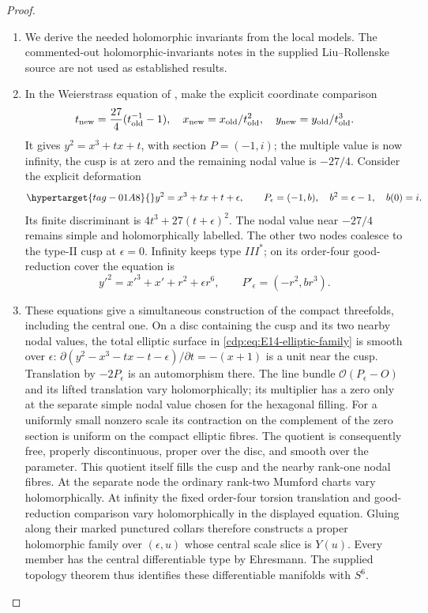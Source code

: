 \begin{proof}

\begin{enumerate}[label={$\langle1\rangle$\arabic*.},leftmargin=*]
\item We derive the needed holomorphic invariants from the local models.
The commented-out holomorphic-invariants notes in the supplied
Liu--Rollenske source are not used as established results.

\item In the Weierstrass equation of \cite[Proposition labelled
\texttt{prop: surface facts}]{LiuRollenske2026}, make the explicit
coordinate comparison
\[
 t_{\rm new}=\frac{27}{4}(t_{\rm old}^{-1}-1),\quad
 x_{\rm new}=x_{\rm old}/t_{\rm old}^2,\quad
 y_{\rm new}=y_{\rm old}/t_{\rm old}^3.
\]
It gives $y^2=x^3+tx+t$, with section $P=(-1,i)$; the multiple
value is now infinity, the cusp is at zero and the remaining nodal
value is $-27/4$. Consider the explicit deformation
\begin{equation}\hypertarget{tag-01A8}{}\label{cdp:eq:E14-elliptic-family}
 y^2=x^3+tx+t+\epsilon,\qquad
 P_\epsilon=(-1,b),\quad b^2=\epsilon-1,
 \quad b(0)=i.
\end{equation}
Its finite discriminant is $4t^3+27(t+\epsilon)^2$.
The nodal value near $-27/4$ remains simple and holomorphically
labelled. The other two nodes coalesce to the type-II cusp at
$\epsilon=0$. Infinity keeps type $III^*$; on its order-four
good-reduction cover the equation is
\[
 y'^2=x'^3+x'+r^2+\epsilon r^6,
 \qquad P'_{\epsilon}=(-r^2,br^3).
\]

\item These equations give a simultaneous construction of the compact
threefolds, including the central one. On a disc containing the cusp
and its two nearby nodal values, the total elliptic surface in
\eqref{cdp:eq:E14-elliptic-family} is smooth over $\epsilon$:
$\partial(y^2-x^3-tx-t-\epsilon)/\partial t=-(x+1)$ is a unit
near the cusp. Translation by $-2P_\epsilon$ is an automorphism
there. The line bundle $\mathcal O(P_\epsilon-O)$ and its lifted
translation vary holomorphically; its multiplier has a zero only
at the separate simple nodal value chosen for the hexagonal filling.
For a uniformly small nonzero scale its contraction on the
complement of the zero section is uniform on the compact elliptic
fibres. The quotient is consequently free, properly discontinuous,
proper over the disc, and smooth over the parameter. This quotient
itself fills the cusp and the nearby rank-one nodal fibres. At the
separate node the ordinary rank-two Mumford charts vary
holomorphically. At infinity the fixed order-four torsion translation
and good-reduction comparison vary holomorphically in the displayed
equation. Gluing along their marked punctured collars therefore
constructs a proper holomorphic family over $(\epsilon,u)$ whose
central scale slice is $Y(u)$. Every member has the central
differentiable type by Ehresmann. The supplied topology theorem
\cite[Theorem labelled \texttt{thm: main}]{LiuRollenske2026} thus
identifies these differentiable manifolds with $S^6$.


\end{enumerate}
\end{proof}
